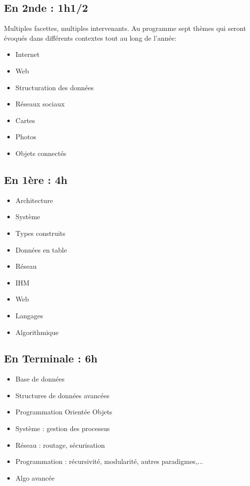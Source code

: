 \documentclass[french,handout]{beamer}
\begin{document}
\subsection{En 2nde : 1h1/2}

\begin{frame}
\protect\hypertarget{organisation-de-lannuxe9e-que-va-t-on-uxe9tudier}{}

Multiples facettes, multiples intervenants. Au programme sept thèmes qui
seront évoqués dans différents contextes tout au long de l'année:

\begin{itemize}
\tightlist
\item
  Internet
\item
  Web
\item
  Structuration des données
\item
  Réseaux sociaux
\item
  Cartes
\item
  Photos
\item
  Objets connectés
\end{itemize}

\end{frame}



\subsection{En 1ère : 4h}

\begin{frame}
  \begin{itemize}
  \item Architecture
  \item Système
  \item Types construits
  \item Données en table
  \item Réseau
  \item IHM
  \item Web
  \item Langages
  \item Algorithmique
  \end{itemize}
\end{frame}

\subsection{En Terminale : 6h}


\begin{frame}
  \begin{itemize}
  \item Base de données
  \item Structures de données avancées
  \item Programmation Orientée Objets
  \item Système : gestion des processus
  \item Réseau : routage, sécurisation
  \item Programmation : récursivité, modularité, autres paradigmes,...
    \item Algo avancée
  \end{itemize}
\end{frame}
\end{document}
